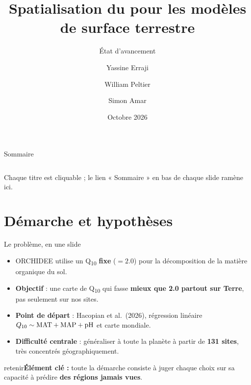 \documentclass[aspectratio=169,10pt]{beamer}
\title{Spatialisation du \Qdix{} pour les modèles de surface terrestre}
\subtitle{État d'avancement}
\author{Yassine Erraji \and William Peltier \and Simon Amar}
\date{Octobre 2026}
\newcommand{\retenir}[1]{\vfill\begin{beamercolorbox}[sep=5pt,rounded=true]{retenir}\small\textbf{Élément clé :} #1\end{beamercolorbox}}
\newcommand{\Qdix}{Q\textsubscript{10}}
\begin{document}
\begin{frame}[plain]
  \titlepage
\end{frame}

\begin{frame}[label=sommaire]{Sommaire}
  \begin{columns}[t]
    \tableofcontents[sections={1-5}]
    \tableofcontents[sections={6-10}]
  \end{columns}
  \vfill
  {\small\color{gray}Chaque titre est cliquable ; le lien « Sommaire » en bas de chaque slide ramène ici.}
\end{frame}

\section{Démarche et hypothèses}

\begin{frame}{Le problème, en une slide}
  \begin{itemize}
    \item ORCHIDEE utilise un \Qdix{} \textbf{fixe} ($=2.0$) pour la décomposition de la matière organique du sol.
    \item \textbf{Objectif} : une carte de \Qdix{} qui fasse \textbf{mieux que 2.0 partout sur Terre}, pas seulement sur nos sites.
    \item \textbf{Point de départ} : Hacopian et al.\ (2026), régression linéaire $\Qdix \sim \text{MAT} + \text{MAP} + \text{pH}$ et carte mondiale.
    \item \textbf{Difficulté centrale} : généraliser à toute la planète à partir de \textbf{131 sites}, très concentrés géographiquement.
  \end{itemize}
  \retenir{toute la démarche consiste à juger chaque choix sur sa capacité à prédire \textbf{des régions jamais vues}.}
\end{frame}
\end{document}
